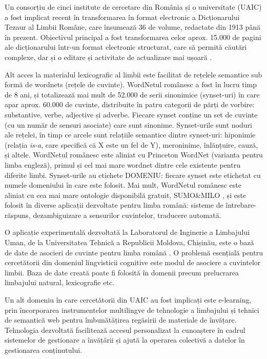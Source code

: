 \documentclass[]{../../metanetpaper}
\begin{document}
\begin{multicols}{2}
Un consorțiu de cinci institute de cercetare din România și o universitate (UAIC) a fost implicat recent în transformarea în format electronic a Dicționarului Tezaur al Limbii Române, care însumează 36 de volume, redactate din 1913 până în prezent. Obiectivul principal a fost transformarea celor aprox. 15.000 de pagini ale dicționarului într-un format electronic structurat, care să permită căutări complexe, dar și o editare și activitate de actualizare mai ușoară \cite{cristea3}.

Alt acces la materialul lexicografic al limbii este facilitat de rețelele semantice sub formă de wordnets (rețele de cuvinte). WordNetul românesc a fost în lucru timp de 8 ani, și totalizează mai mult de 52.000 de serii sinonimice (synset-uri) în care apar aprox. 60.000 de cuvinte, distribuite în patru categorii de părți de vorbire: substantive, verbe, adjective și adverbe. Fiecare synset conține un set de cuvinte (cu un număr de sensuri asociate) care sunt sinonime. Synset-urile sunt noduri ale rețelei, în timp ce arcele sunt relațiile semantice dintre synset-uri: hiponimie (relația \textit{is-a}, care specifică că X este un fel de Y), meroninime, înlănțuire, cauză, și altele. WordNetul românesc este aliniat cu Princeton WordNet \cite{wnURL} (varianta pentru limba engleză), primul și cel mai mare wordnet dintre cele existente pentru diferite limbi. Synset-urile au etichete DOMENIU: fiecare synset este etichetat cu numele domeniului în care este folosit. Mai mult, WordNetul românesc este aliniat cu cea mai mare ontologie disponibilă gratuit, SUMO\&MILO \cite{ro_wnURL}, și este folosit în diverse aplicații dezvoltate pentru limba română: sisteme de întrebare-răspuns, dezambiguizare a sensurilor cuvintelor, traducere automată.

O aplicație experimentală dezvoltată la Laboratorul de Inginerie a Limbajului Uman, de la Universitatea Tehnică a Republicii Moldova, Chișinău, este o bază de date de asocieri de cuvinte pentru limba română \cite{sem_dict}. O problemă esențială pentru cercetătorii din domeniul lingvisticii cognitive este modul de asociere a cuvintelor limbii. Baza de date creată poate fi folosită în domenii precum prelucrarea limbajului natural, lexicografie etc.

Un alt domeniu în care cercetătorii din UAIC au fost implicați este e-learning, prin încorporarea instrumentelor multilingve de tehnologie a limbajului și tehnici de semantică web pentru îmbunătățirea regăsirii de materiale de învățare. Tehnologia dezvoltată facilitează accesul personalizat la cunoaștere în cadrul sistemelor de gestionare a învățării și ajută la operarea colectivă a datelor în gestionarea conținutului.


\end{multicols}
\end{document}
